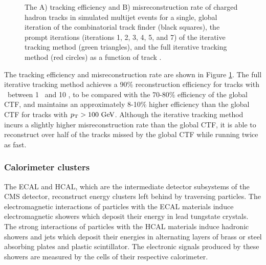\begin{figure}[htbp]
{  }
  \caption[Track Reconstruction Performance]{The A) tracking efficiency and B) misreconstruction rate of charged hadron tracks in simulated multijet events for a single, global iteration of the combinatorial track finder (black squares), the prompt iterations (iterations 1, 2, 3, 4, 5, and 7) of the iterative tracking method (green triangles), and the full iterative tracking method (red circles) as a function of track \pT.\cite{PARTICLEFLOW}}
    \label{fig:pftrack_perf}
\end{figure}

The tracking efficiency and misreconstruction rate are shown in Figure \ref{fig:pftrack_perf}. The full iterative tracking method achieves a 90\% reconstruction efficiency for tracks with \pT\ between 1 \GeV\ and 10 \GeV, to be compared with the 70-80\% efficiency of the global CTF, and maintains an approximately 8-10\% higher efficiency than the global CTF for tracks with $\pT > 100\ \GeV$. Although the iterative tracking method incurs a slightly higher misreconstruction rate than the global CTF, it is able to reconstruct over half of the tracks missed by the global CTF while running twice as fast.

\subsubsection{Calorimeter clusters}

The ECAL and HCAL, which are the intermediate detector subsystems of the CMS detector, reconstruct energy clusters left behind by traversing particles. The electromagnetic interactions of particles with the ECAL materials induce electromagnetic showers which deposit their energy in lead tungstate crystals. The strong interactions of particles with the HCAL materials induce hadronic showers and jets which deposit their energies in alternating layers of brass or steel absorbing plates and plastic scintillator. The electronic signals produced by these showers are measured by the cells of their respective calorimeter.

